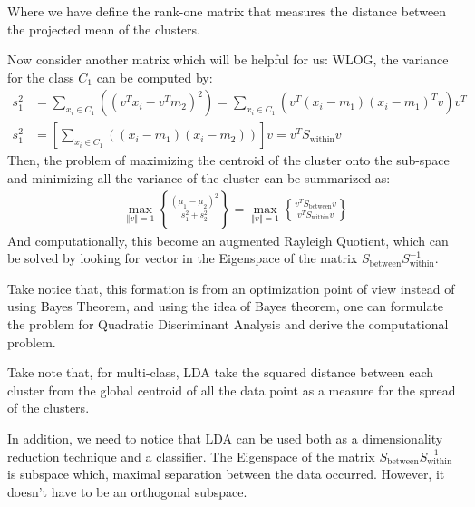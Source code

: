 \documentclass{article}
\begin{document}
        Where we have define the rank-one matrix that measures the distance between the projected mean of the clusters. 
        \par
        Now consider another matrix which will be helpful for us: WLOG, the variance for the class $C_1$ can be computed by: 
        \begin{align*}\tag{4}\label{eqn:4}
            s_1^2 &= \sum_{x_i \in C_1}^{}\left(
                    (v^Tx_i - v^Tm_2)^2
                \right)
                =
                \sum_{x_i\in C_1}^{}\left(
                        v^T(x_i - m_1)(x_i - m_1)^Tv
                    \right)
            v^T
            \\
            s_1^2 &=
            \left\lbrack
                \sum_{x_i\in C_1}^{}\left(
                        (x_i - m_1)(x_i - m_2)
                    \right)
            \right\rbrack v
            = v^TS_{\text{within}}v
        \end{align*}
        Then, the problem of maximizing the centroid of the cluster onto the sub-space and minimizing all the variance of the cluster can be summarized as: 
        \begin{align*}\tag{5}\label{eqn:5}
            \max_{\left\Vert
                v
            \right\Vert = 1} \left\lbrace
                \frac{(\mu_1 - \mu_2)^2}{s_1^2 + s_2^2}
            \right\rbrace
            =
            \max_{\Vert v\Vert = 1} \left\lbrace
            \frac{v^TS_{\text{between}}v}{v^TS_{\text{within}}v}
            \right\rbrace
        \end{align*}
        And computationally, this become an augmented Rayleigh Quotient, which can be solved by looking for vector in the Eigenspace of the matrix $S_{\text{between}}S_{\text{within}}^{-1}$. 
        \par
        Take notice that, this formation is from an optimization point of view instead of using Bayes Theorem, and using the idea of Bayes theorem, one can formulate the problem for Quadratic Discriminant Analysis and derive the computational problem. 
        \par
        Take note that, for multi-class, LDA take the squared distance between each cluster from the global centroid of all the data point as a measure for the spread of the clusters. 
        \par
        In addition, we need to notice that LDA can be used both as a dimensionality reduction technique and a classifier. The Eigenspace of the matrix $S_{\text{between}}S_{\text{within}}^{-1}$ is subspace which, maximal separation between the data occurred. However, it doesn't have to be an orthogonal subspace. 
\end{document}
